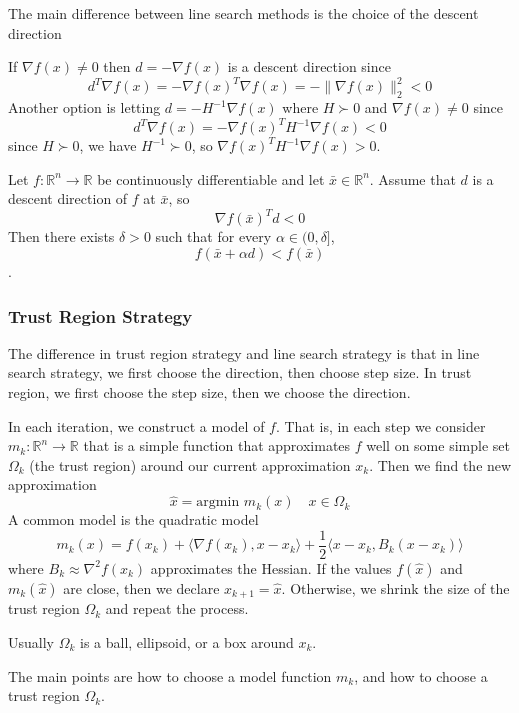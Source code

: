 The main difference between line search methods is the choice of the descent direction
\begin{problem}[Example]
  If $\nabla f(x) \neq 0$ then $d = - \nabla f(x)$ is a descent direction since
  $$d^T \nabla f(x) = -\nabla f(x)^T \nabla f(x) = - \|\nabla f(x) \|^2_2 < 0$$
  Another option is letting $d = -H^{-1} \nabla f(x)$ where $H \succ 0$ and $\nabla f(x) \neq 0$ since
  $$d^T \nabla f(x) = - \nabla f(x)^T H^{-1} \nabla f(x) < 0$$
  since $H \succ 0$, we have $H^{-1} \succ 0$, so $\nabla f(x)^T H^{-1} \nabla f(x) > 0$.
\end{problem}
\begin{theorem}
  Let $f: \mathbb R^n \to \mathbb R$ be continuously differentiable and let $\bar x \in \mathbb R^n$. Assume that $d$ is a descent direction of $f$ at $\bar x$, so $$\nabla f(\bar x)^T d < 0$$ Then there exists $\delta > 0$ such that for every $\alpha \in (0, \delta]$, 
  $$f(\bar x + \alpha d) < f(\bar x)$$.
\end{theorem}



\subsubsection{Trust Region Strategy}
The difference in trust region strategy and line search strategy is that in line search strategy, we first choose the direction, then choose step size. In trust region, we first choose the step size, then we choose the direction.
\begin{definition}
  In each iteration, we construct a model of $f$. That is, in each step we consider $m_k: \mathbb R^n \to \mathbb R$ that is a simple function that approximates $f$ well on some simple set $\Omega_k$ (the trust region) around our current approximation $x_k$. Then we find the new approximation $$\hat x = \text{argmin } m_k(x) \quad \text{$x \in \Omega_k$}$$
  A common model is the quadratic model $$m_k(x) = f(x_k) + \langle \nabla f(x_k), x - x_k \rangle + \frac{1}{2} \langle x - x_k, B_k(x - x_k) \rangle$$ where $B_k \approx \nabla^2 f(x_k)$ approximates the Hessian. If the values $f(\hat x)$ and $m_k(\hat x)$ are close, then we declare $x_{k+1} = \hat x$. Otherwise, we shrink the size of the trust region $\Omega_k$ and repeat the process.

  Usually $\Omega_k$ is a ball, ellipsoid, or a box around $x_k$.

  The main points are how to choose a model function $m_k$, and how to choose a trust region $\Omega_k$.
\end{definition}

